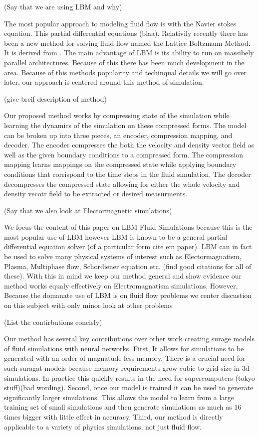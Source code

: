 \documentclass{article}
\begin{document}
(Say that we are using LBM and why)

The most popular approach to modeling fluid flow is with the Navier stokes equation. This partial differential equations (blaa). Relativily recently there has been a new method for solving fluid flow named the Lattice Boltzmann Method. It is derived from . The main advantage of LBM is its ability to run on massibely parallel architectures. Because of this there has been much development in the area. Because of this methods popularity and techinqual details we will go over later, our approach is centered around this method of simulation.

(give breif description of method)

Our proposed method works by compressing state of the simulation while learning the dynamics of the simulation on these compressed forms. The model can be broken up into three pieces, an encoder, compression mapping, and decoder. The encoder compresses the both the velocity and density vector field as well as the given boundary conditions to a compressed form. The compression mapping learns mappings on the compressed state while applying boundary conditions that corrispond to the time steps in the fluid simulation. The decoder decompresses the compressed state allowing for either the whole velocity and density vecotr field to be extracted or desired measurments.

(Say that we also look at Electormagnetic simulations)

We focus the content of this paper on LBM Fluid Simulations because this is the most popular use of LBM however LBM is known to be a general partial differential equation solver (of a particular form cite em paper). LBM can in fact be used to solve many physical systems of interest such as Electormagnatism, Plasma, Multiphase flow, Schordiener equation etc. (find good citations for all of these). With this in mind we keep our method general and show evidence our method works equaly effectively on Electromagnatism simulations. However, Because the domanate use of LBM is on fluid flow problems we center discustion on this subject with only minor look at other problems

(List the contirbutions concisly)

Our method has several key contributions over other work creating surage models of fluid simulations with neural networks. First, It allows for simulations to be generated with an order of magnatude less memory. There is a crucial need for such suragat models because memory requirements grow cubic to grid size in 3d simulations. In practice this quickly results in the need for supercomputers (tokyo stuff)(bad wording). Second, once our model is trained it can be used to generate significantly larger simulations. This allows the model to learn from a large training set of small simulations and then generate simulations as much as 16 times bigger with little effect in accuracy. Third, our method is directly applicable to a variety of physics simulations, not just fluid flow.
\end{document}
